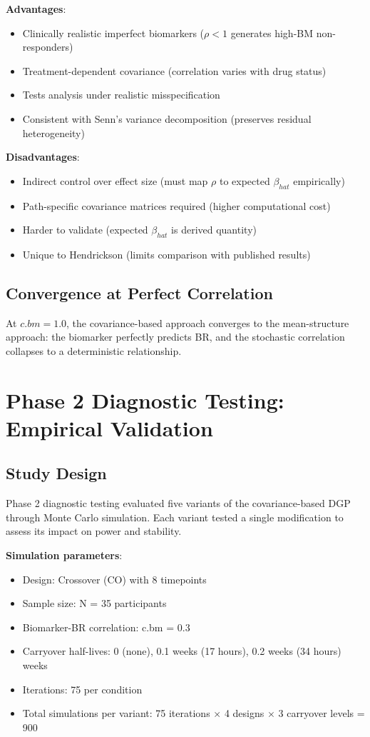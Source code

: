 \documentclass[12pt,a4paper]{article}
\begin{document}
\textbf{Advantages}:
\begin{itemize}
\item Clinically realistic imperfect biomarkers ($\rho < 1$ generates high-BM non-responders)
\item Treatment-dependent covariance (correlation varies with drug status)
\item Tests analysis under realistic misspecification
\item Consistent with Senn's variance decomposition (preserves residual heterogeneity)
\end{itemize}

\textbf{Disadvantages}:
\begin{itemize}
\item Indirect control over effect size (must map $\rho$ to expected $\beta_{hat}$ empirically)
\item Path-specific covariance matrices required (higher computational cost)
\item Harder to validate (expected $\beta_{hat}$ is derived quantity)
\item Unique to Hendrickson (limits comparison with published results)
\end{itemize}

\subsection{Convergence at Perfect Correlation}

At $c.bm = 1.0$, the covariance-based approach converges to the mean-structure approach: the biomarker perfectly predicts BR, and the stochastic correlation collapses to a deterministic relationship.

\section{Phase 2 Diagnostic Testing: Empirical Validation}

\subsection{Study Design}

Phase 2 diagnostic testing evaluated five variants of the covariance-based DGP through Monte Carlo simulation. Each variant tested a single modification to assess its impact on power and stability.

\textbf{Simulation parameters}:
\begin{itemize}
\item Design: Crossover (CO) with 8 timepoints
\item Sample size: N = 35 participants
\item Biomarker-BR correlation: c.bm = 0.3
\item Carryover half-lives: 0 (none), 0.1 weeks (17 hours), 0.2 weeks (34 hours) weeks
\item Iterations: 75 per condition
\item Total simulations per variant: 75 iterations $\times$ 4 designs $\times$ 3 carryover levels = 900
\end{itemize}
\end{document}
